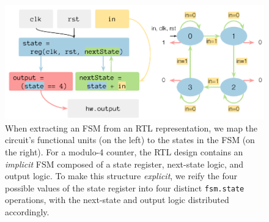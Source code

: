 \documentclass[acmsmall,screen,review]{acmart}
\begin{document}
\begin{figure}
  \includegraphics{rtl-to-fsm.pdf}
    \caption{When extracting an FSM from an RTL representation, 
      we map the circuit's functional units (on the left) to the states in the FSM (on the right). For a modulo-4 counter, 
      the RTL design contains an \textit{implicit} FSM composed of a state register, next-state logic, and output logic.
      To make this structure \textit{explicit}, we reify the four possible values of the state register into four distinct \texttt{fsm.state} operations, with the next-state and output logic distributed accordingly.}
    \label{fig:fsm-extraction}
\end{figure}
\end{document}
